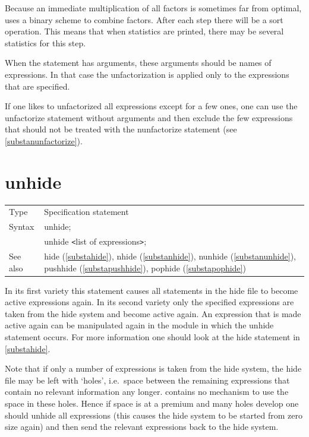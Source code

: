 \noindent Because an immediate multiplication of all factors is sometimes 
far from optimal, \FORM{} uses a binary scheme to combine factors. After each 
step there will be a sort operation. This means that when statistics are 
printed, there may be several statistics for this step.

\noindent When the statement has arguments, these arguments should be names 
of expressions. In that case the unfactorization is applied only to the 
expressions that are specified.

\noindent If one likes to unfactorized all expressions except for a few 
ones, one can use the unfactorize statement without arguments and then 
exclude the few expressions that should not be treated with the 
nunfactorize statement (see \ref{substanunfactorize}).
\vspace{10mm} 


\section{unhide}
\label{substaunhide}

\noindent \begin{tabular}{ll}
Type & Specification statement\\
Syntax & unhide; \\
       & unhide {\tt<}list of expressions{\tt>};
\\ See also & hide (\ref{substahide}),
              nhide (\ref{substanhide}),
              nunhide (\ref{substanunhide}),
              pushhide (\ref{substapushhide}),
              pophide (\ref{substapophide})
\end{tabular} \vspace{4mm}

\noindent In its first variety this statement causes all 
statements in the hide file to become 
active expressions again. In its second variety only the 
specified expressions are taken from the hide system and become active 
again. An expression that is made active again can be manipulated again in 
the module in which the unhide statement occurs. For more information one 
should look at the hide statement in \ref{substahide}. \vspace{4mm}

\noindent Note that if only a number of expressions is taken from the hide 
system, the hide file may be left with `holes', i.e.\ space between the 
remaining expressions that contain no relevant information any longer. 
{\FORM} contains no mechanism to use the space in these holes. Hence if 
space is at a premium and many holes develop one should unhide all 
expressions (this causes the hide system to be started from zero size 
again) and then send the relevant expressions back to the hide system. 
\vspace{10mm}

